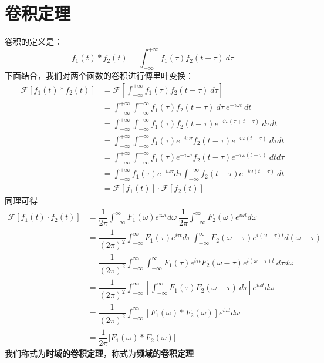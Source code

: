     \section{卷积定理}
        卷积的定义是：
        \begin{equation}
            f_1(t)*f_2(t) = \int_{-\infty}^{+\infty}f_1(\tau)f_2(t - \tau)\ d\tau
            \label{eq: 1.31}
        \end{equation}
        下面结合，我们对两个函数的卷积进行傅里叶变换：
        \begin{equation}
            \begin{split}
                \mathscr{F}[f_1(t)*f_2(t)] &= \mathscr{F}[\int_{-\infty}^{+\infty}f_1(\tau)f_2(t - \tau)\ d\tau]\\
                &= \int_{-\infty}^{+\infty}\int_{-\infty}^{+\infty}f_1(\tau)f_2(t - \tau)\ d\tau\ e^{-i\omega t}\ dt\\
                &= \int_{-\infty}^{+\infty}\int_{-\infty}^{+\infty}f_1(\tau)f_2(t - \tau)e^{-i\omega (\tau + t -\tau)}\ d\tau dt\\
                &= \int_{-\infty}^{+\infty}\int_{-\infty}^{+\infty}f_1(\tau)e^{-i\omega \tau}f_2(t - \tau)e^{-i\omega (t - \tau)}\ d\tau dt\\
                &= \int_{-\infty}^{+\infty}\int_{-\infty}^{+\infty}f_1(\tau)e^{-i\omega \tau}f_2(t - \tau)e^{-i\omega (t - \tau)}\ dt d\tau\\
                &= \int_{-\infty}^{+\infty}f_1(\tau)e^{-i\omega \tau}d\tau\int_{-\infty}^{+\infty}f_2(t - \tau)e^{-i\omega (t - \tau)}\ dt\\
                &= \mathscr{F}[f_1(t)]\cdot\mathscr{F}[f_2(t)]
            \end{split}
            \label{eq: 1.32}
        \end{equation}
        同理可得
        \begin{equation}
            \begin{split}
                \mathscr{F}[f_1(t)\cdot f_2(t)] &= \dfrac{1}{2\pi}\int_{-\infty}^{\infty}F_1(\omega) e^{i\omega t} d\omega\ \dfrac{1}{2\pi}\int_{-\infty}^{\infty}F_2(\omega) e^{i\omega t} d\omega\\
                &= \dfrac{1}{(2\pi)^2}\int_{-\infty}^{\infty}F_1(\tau) e^{i\tau t} d\tau\ \int_{-\infty}^{\infty}F_2(\omega - \tau) e^{i(\omega - \tau) t} d(\omega - \tau)\\
                &= \dfrac{1}{(2\pi)^2}\int_{-\infty}^{\infty}\int_{-\infty}^{\infty}F_1(\tau) e^{i\tau t} F_2(\omega - \tau) e^{i(\omega - \tau) t}\ d\tau d\omega\\
                &= \dfrac{1}{(2\pi)^2}\int_{-\infty}^{\infty}\left[\int_{-\infty}^{\infty}F_1(\tau) F_2(\omega - \tau)\ d\tau\right]e^{i\omega t}d\omega\\
                &= \dfrac{1}{(2\pi)^2}\int_{-\infty}^{\infty}\left[F_1(\omega)*F_2(\omega)\right]e^{i\omega t}d\omega\\
                &= \dfrac{1}{2\pi}\mathscr[F_1(\omega)*F_2(\omega)]
            \end{split}
            \label{eq: 1.33}
        \end{equation}
        我们称式为\textbf{时域的卷积定理}，称式为\textbf{频域的卷积定理}

